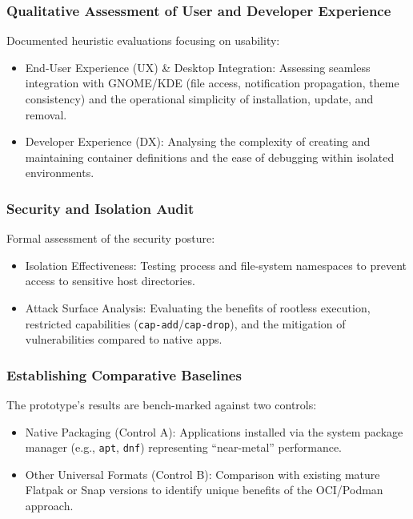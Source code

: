 \documentclass[journal,onecolumn]{IEEEtran}
\newcommand{\code}[1]{\texttt{#1}}
\begin{document}
\subsubsection{Qualitative Assessment of User and Developer Experience}
Documented heuristic evaluations focusing on usability:
\begin{itemize}
    \item End-User Experience (UX) \& Desktop Integration: Assessing seamless integration with GNOME/KDE (file access, notification propagation, theme consistency) and the operational simplicity of installation, update, and removal.
    \item Developer Experience (DX): Analysing the complexity of creating and maintaining container definitions and the ease of debugging within isolated environments.
\end{itemize}

\subsubsection{Security and Isolation Audit}
Formal assessment of the security posture:
\begin{itemize}
    \item Isolation Effectiveness: Testing process and file-system namespaces to prevent access to sensitive host directories.
    \item Attack Surface Analysis: Evaluating the benefits of rootless execution, restricted capabilities (\code{cap-add}/\code{cap-drop}), and the mitigation of vulnerabilities compared to native apps.
\end{itemize}

\subsubsection{Establishing Comparative Baselines}
The prototype’s results are bench-marked against two controls:
\begin{itemize}
    \item Native Packaging (Control A): Applications installed via the system package manager (e.g., \code{apt}, \code{dnf}) representing ``near-metal'' performance.
    \item Other Universal Formats (Control B): Comparison with existing mature Flatpak or Snap versions to identify unique benefits of the OCI/Podman approach.
\end{itemize}
\end{document}
